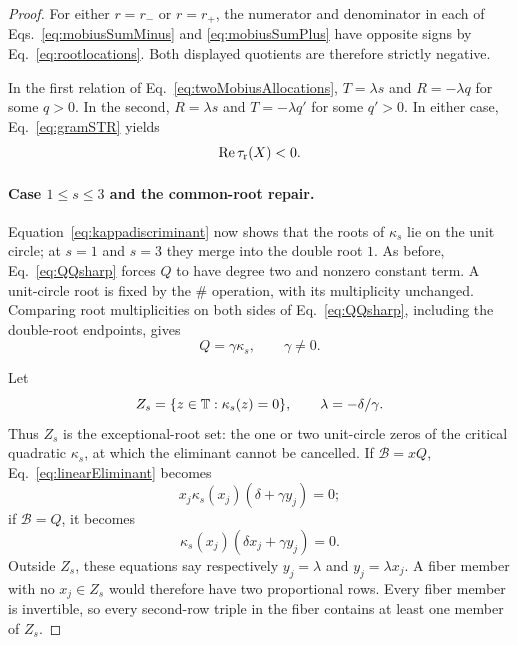 \begin{proof}
For either $r=r_-$ or $r=r_+$, the numerator and denominator in each of Eqs.~\eqref{eq:mobiusSumMinus} and \eqref{eq:mobiusSumPlus} have opposite signs by Eq.~\eqref{eq:rootlocations}.  Both displayed quotients are therefore strictly negative.

In the first relation of Eq.~\eqref{eq:twoMobiusAllocations}, $T=\lambda s$ and $R=-\lambda q$ for some $q>0$.  In the second, $R=\lambda s$ and $T=-\lambda q'$ for some $q'>0$.  In either case, Eq.~\eqref{eq:gramSTR} yields
\begin{equation}
\operatorname{Re}\tau_{\rm r}(X)<0.
\label{eq:mobiusnegative}
\end{equation}

\paragraph{\texorpdfstring{Case $1\leq s\leq3$ and the common-root repair}{Case 1<=s<=3 and the common-root repair}.}

Equation~\eqref{eq:kappadiscriminant} now shows that the roots of $\kappa_s$ lie on the unit circle; at $s=1$ and $s=3$ they merge into the double root $1$. As before, Eq.~\eqref{eq:QQsharp} forces $Q$ to have degree two and nonzero constant term.  A unit-circle root is fixed by the $\#$ operation, with its multiplicity unchanged.  Comparing root multiplicities on both sides of Eq.~\eqref{eq:QQsharp}, including the double-root endpoints, gives
\begin{equation}
Q=\gamma\kappa_s,
\qquad \gamma\neq0.
\label{eq:QgammaKappa}
\end{equation}

Let
\begin{equation}
Z_s=\{z\in\mathbb T:\kappa_s(z)=0\},
\qquad \lambda=-\delta/\gamma.
\label{eq:Zs}
\end{equation}
Thus $Z_s$ is the exceptional-root set: the one or two unit-circle zeros of the critical quadratic $\kappa_s$, at which the eliminant cannot be cancelled. If $\mathcal B=xQ$, Eq.~\eqref{eq:linearEliminant} becomes
\begin{equation}
x_j\kappa_s(x_j)(\delta+\gamma y_j)=0;
\label{eq:commonrootcase1}
\end{equation}
if $\mathcal B=Q$, it becomes
\begin{equation}
\kappa_s(x_j)(\delta x_j+\gamma y_j)=0.
\label{eq:commonrootcase2}
\end{equation}
Outside $Z_s$, these equations say respectively $y_j=\lambda$ and $y_j=\lambda x_j$.  A fiber member with no $x_j\in Z_s$ would therefore have two proportional rows.  Every fiber member is invertible, so every second-row triple in the fiber contains at least one member of $Z_s$.


\end{proof}
